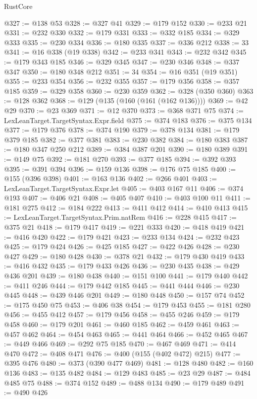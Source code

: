 \begin{lexlean}{RustCore}
\begin{coremodule}
@327 := @138 @53
@328 := @327 @41
@329 := @179 @152
@330 := @233 @21
@331 := @232 @330
@332 := @179 @331
@333 := @332 @185
@334 := @329 @333
@335 := @230 @334
@336 := @180 @335
@337 := @336 @212
@338 := 33
@341 := @16 @338 (@19 @338)
@342 := @233 @341
@343 := @232 @342
@345 := @179 @343 @185
@346 := @329 @345
@347 := @230 @346
@348 := @337 @347
@350 := @180 @348 @212
@351 := 34
@354 := @16 @351 (@19 @351)
@355 := @233 @354
@356 := @232 @355
@357 := @179 @356
@358 := @357 @185
@359 := @329 @358
@360 := @230 @359
@362 := @328 (@350 @360)
@363 := @128 @362
@368 := @129 (@135 (@160 (@161 (@162 @136))))
@369 := @42 @29
@370 := @23 @369
@371 := @12 @370
@373 := @368 @371 @75
@374 := LexLeanTarget.TargetSyntax.Expr.field
@375 := @374 @183
@376 := @375 @134
@377 := @179 @376
@378 := @374 @190
@379 := @378 @134
@381 := @179 @379 @185
@382 := @377 @381
@383 := @230 @382
@384 := @180 @383
@387 := @180 @347 @250 @212
@389 := @384 @387 @201
@390 := @180 @389
@391 := @149 @75
@392 := @181 @270
@393 := @377 @185
@394 := @392 @393
@395 := @391 @394
@396 := @159 @136
@398 := @176 @75 @185
@400 := @155 (@396 @398)
@401 := @163 @136
@402 := @266 @401
@403 := LexLeanTarget.TargetSyntax.Expr.let
@405 := @403 @167 @11
@406 := @374 @193
@407 := @406 @21
@408 := @405 @407
@410 := @403 @100 @11
@411 := @181 @275
@412 := @184 @222
@413 := @411 @412
@414 := @410 @413
@415 := LexLeanTarget.TargetSyntax.Prim.natRem
@416 := @228 @415
@417 := @375 @21
@418 := @179 @417
@419 := @221 @333
@420 := @418 @419
@421 := @416 @420
@422 := @179 @421
@423 := @233 @134
@424 := @232 @423
@425 := @179 @424
@426 := @425 @185
@427 := @422 @426
@428 := @230 @427
@429 := @180 @428
@430 := @378 @21
@432 := @179 @430 @419
@433 := @416 @432
@435 := @179 @433 @426
@436 := @230 @435
@438 := @429 @436 @201
@439 := @180 @438
@440 := @151 @100
@441 := @179 @440
@442 := @411 @246
@444 := @179 @442 @185
@445 := @441 @444
@446 := @230 @445
@448 := @439 @446 @201
@449 := @180 @448
@450 := @157 @74
@452 := @175 @450 @75
@453 := @406 @38
@454 := @179 @453
@455 := @181 @280
@456 := @455 @412
@457 := @179 @456
@458 := @455 @246
@459 := @179 @458
@460 := @179 @201
@461 := @460 @185
@462 := @459 @461
@463 := @457 @462
@464 := @454 @463
@465 := @441 @464
@466 := @452 @465
@467 := @449 @466
@469 := @292 @75 @185
@470 := @467 @469
@471 := @414 @470
@472 := @408 @471
@476 := @400 (@155 (@402 @472) @215)
@477 := @395 @476
@480 := @373 (@390 @477 @469)
@481 := @128 @480
@482 := @160 @136
@483 := @135 @482
@484 := @129 @483
@485 := @23 @29
@487 := @484 @485 @75
@488 := @374 @152
@489 := @488 @134
@490 := @179 @489
@491 := @490 @426

\end{coremodule}
\end{lexlean}
